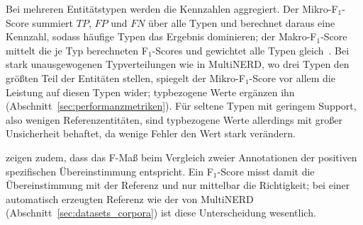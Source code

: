 Bei mehreren Entitätstypen werden die Kennzahlen aggregiert.
Der Mikro-F$_1$-Score summiert $TP$, $FP$ und $FN$ über alle Typen und
berechnet daraus eine Kennzahl, sodass häufige Typen das Ergebnis
dominieren; der Makro-F$_1$-Score mittelt die je Typ berechneten
F$_1$-Scores und gewichtet alle Typen gleich~\cite{manning2008introduction}.
Bei stark unausgewogenen Typverteilungen wie in MultiNERD, wo drei Typen
den größten Teil der Entitäten stellen, spiegelt der Mikro-F$_1$-Score
vor allem die Leistung auf diesen Typen wider; typbezogene Werte
ergänzen ihn (Abschnitt~\ref{sec:performanzmetriken}).
Für seltene Typen mit geringem Support, also wenigen
Referenzentitäten, sind typbezogene Werte allerdings mit großer Unsicherheit
behaftet, da wenige Fehler den Wert stark verändern.

\textcite{hripcsak2005agreement} zeigen zudem, dass das F-Maß beim
Vergleich zweier Annotationen der positiven spezifischen Übereinstimmung
entspricht.
Ein F$_1$-Score misst damit die Übereinstimmung mit der Referenz und
nur mittelbar die Richtigkeit; bei einer automatisch erzeugten Referenz
wie der von MultiNERD (Abschnitt~\ref{sec:datasets_corpora}) ist diese
Unterscheidung wesentlich.
